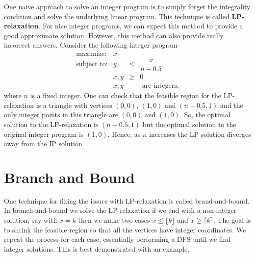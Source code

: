 \documentclass[
]{book}
\theoremstyle{definition}
\theoremstyle{definition}
\theoremstyle{definition}
\theoremstyle{definition}
\theoremstyle{remark}
\begin{document}
One naive approach to solve an integer program is to simply forget the integrality condition and solve the underlying linear program.
This technique is called \textbf{LP-relaxation}.
For nice integer programs, we can expect this method to provide a good approximate solution. However, this method can also provide really incorrect answers.
Consider the following integer program
\begin{equation*}
\begin{array}{lllll}
  \mbox{maximize:} & x \\ 
  \mbox{subject to:} & y & \le & \dfrac{x}{n-0.5} \\
  & x, y & \ge & 0 \\ 
  & x, y & & \mbox{ are integers,}
\end{array}
\end{equation*}
where \(n\) is a fixed integer.
One can check that the feasible region for the LP-relaxation is a triangle with vertices \((0,0)\), \((1,0)\) and \((n - 0.5, 1)\) and the only integer points in this triangle are \((0,0)\) and \((1,0)\).
So, the optimal solution to the LP-relaxation is \((n - 0.5, 1)\) but the optimal solution to the original integer program is \((1,0)\).
Hence, as \(n\) increases the LP solution diverges away from the IP solution.

\hypertarget{branch-and-bound}{%
\section{Branch and Bound}\label{branch-and-bound}}

One technique for fixing the issues with LP-relaxation is called brand-and-bound.
In branch-and-bound we solve the LP-relaxation if we end with a non-integer solution, say with \(x = k\) then we make two cases \(x \le \lfloor k \rfloor\) and \(x \ge \lceil k \rceil\). The goal is to shrink the feasible region so that all the vertices have integer coordinates.
We repeat the process for each case, essentially performing a DFS until we find integer solutions.
This is best demonstrated with an example.
\end{document}
